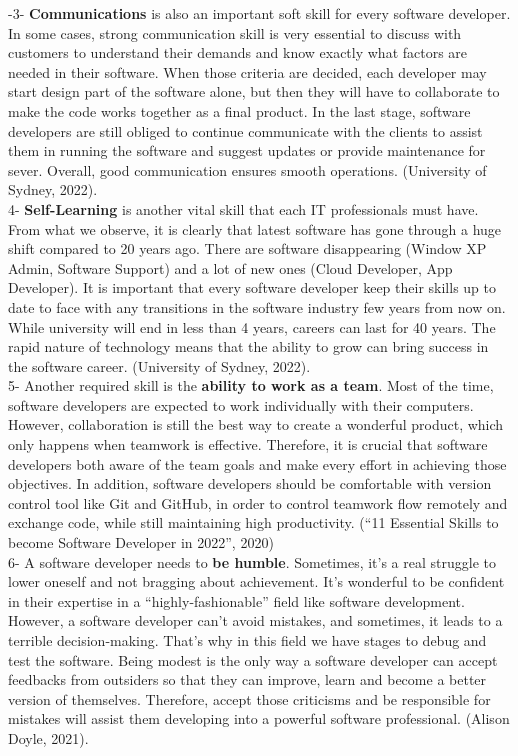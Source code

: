 \documentclass[a4paper, 11pt]{report}
\begin{document}
	-3- \textbf{Communications} is also an important soft skill for every software developer. In some cases, strong communication skill is very essential to discuss with customers to understand their demands and know exactly what factors are needed in their software. When those criteria are decided, each developer may start design part of the software alone, but then they will have to collaborate to make the code works together as a final product. In the last stage, software developers are still obliged to continue communicate with the clients to assist them in running the software and suggest updates or provide maintenance for sever. Overall, good communication ensures smooth operations. (University of Sydney, 2022).\\
	
	4- \textbf{Self-Learning} is another vital skill that each IT professionals must have. From what we observe, it is clearly that latest software has gone through a huge shift compared to 20 years ago. There are software disappearing (Window XP Admin, Software Support) and a lot of new ones (Cloud Developer, App Developer). It is important that every software developer keep their skills up to date to face with any transitions in the software industry few years from now on. While university will end in less than 4 years, careers can last for 40 years. The rapid nature of technology means that the ability to grow can bring success in the software career. (University of Sydney, 2022). \nocite{three_four}  \\
	
	5- Another required skill is the \textbf{ability to work as a team}. Most of the time, software developers are expected to work individually with their computers. However, collaboration is still the best way to create a wonderful product, which only happens when teamwork is effective.  Therefore, it is crucial that software developers both aware of the team goals and make every effort in achieving those objectives. In addition, software developers should be comfortable with version control tool like Git and GitHub, in order to control teamwork flow remotely and exchange code, while still maintaining high productivity. (“11 Essential Skills to become Software Developer in 2022”, 2020) \nocite{five_eight}\\
	
	6- A software developer needs to \textbf{be humble}. Sometimes, it’s a real struggle to lower oneself and not bragging about achievement. It’s wonderful to be confident in their expertise in a “highly-fashionable” field like software development. However, a software developer can’t avoid mistakes, and sometimes, it leads to a terrible decision-making. That’s why in this field we have stages to debug and test the software. Being modest is the only way a software developer can accept feedbacks from outsiders so that they can improve, learn and become a better version of themselves. Therefore, accept those criticisms and be responsible for mistakes will assist them developing into a powerful software professional. (Alison Doyle, 2021). \nocite{six}\\
	
\end{document}
